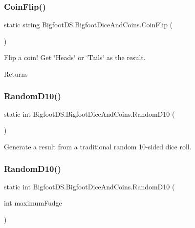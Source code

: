 \subsubsection{\texorpdfstring{Coin\+Flip()}{CoinFlip()}}
{\footnotesize\ttfamily static string Bigfoot\+D\+S.\+Bigfoot\+Dice\+And\+Coins.\+Coin\+Flip (\begin{DoxyParamCaption}{ }\end{DoxyParamCaption})\hspace{0.3cm}{\ttfamily [static]}}



Flip a coin! Get \char`\"{}\+Heads\char`\"{} or \char`\"{}\+Tails\char`\"{} as the result. 

\begin{DoxyReturn}{Returns}

\end{DoxyReturn}
\mbox{\label{class_bigfoot_d_s_1_1_bigfoot_dice_and_coins_a5ac73a488910e9de5b8be7763ec4dbdd}} 
\subsubsection{\texorpdfstring{Random\+D10()}{RandomD10()}\hspace{0.1cm}{\footnotesize\ttfamily [1/2]}}
{\footnotesize\ttfamily static int Bigfoot\+D\+S.\+Bigfoot\+Dice\+And\+Coins.\+Random\+D10 (\begin{DoxyParamCaption}{ }\end{DoxyParamCaption})\hspace{0.3cm}{\ttfamily [static]}}



Generate a result from a traditional random 10-\/sided dice roll. 

\mbox{\label{class_bigfoot_d_s_1_1_bigfoot_dice_and_coins_a1b6f0df165f0f040853099e294e1330f}} 
\subsubsection{\texorpdfstring{Random\+D10()}{RandomD10()}\hspace{0.1cm}{\footnotesize\ttfamily [2/2]}}
{\footnotesize\ttfamily static int Bigfoot\+D\+S.\+Bigfoot\+Dice\+And\+Coins.\+Random\+D10 (\begin{DoxyParamCaption}\item[{int}]{maximum\+Fudge }\end{DoxyParamCaption})\hspace{0.3cm}{\ttfamily [static]}}



